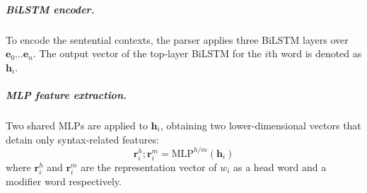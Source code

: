 
\subparagraph{BiLSTM encoder.} To encode the sentential contexts,
the parser applies three BiLSTM layers %
over %
$\mathbf{e}_0 \dots \mathbf{e}_n$. The output vector of the top-layer BiLSTM for the $i$th word
is denoted as $\mathbf{h}_i$.

\subparagraph{MLP feature extraction.} Two shared MLPs are applied to $\mathbf{h}_i$, obtaining
two lower-dimensional vectors that detain only syntax-related features:
\begin{equation}
    \label{mlp-arc}
    \mathbf{r}_i^{h}; \mathbf{r}_i^{m} =\mathrm{MLP}^{h/m} \left( \mathbf{h}_i \right)
\end{equation}
where $\mathbf{r}_i^{h}$ and $\mathbf{r}_i^{m}$ are the representation vector of $w_i$ as a head word and a modifier word respectively.


